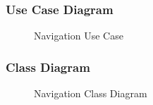 \subsubsection{Use Case Diagram}
	\begin{figure}[h!]
	\caption{Navigation Use Case}
	\end{figure}

\subsubsection{Class Diagram}
	\begin{figure}[h!]
	\caption{Navigation Class Diagram}
	\end{figure}

